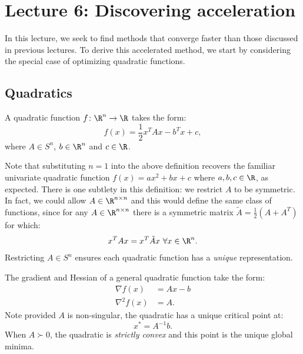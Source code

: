 \section{Lecture 6: Discovering acceleration}

In this lecture, we seek to find methods that converge faster than those discussed in previous lectures. To derive this accelerated method, we start by considering the special case of optimizing quadratic functions.

\subsection{Quadratics}

\begin{definition} A quadratic function $f\colon\R^n \to \R$ takes the form: 
\begin{equation*}
f(x) = \frac{1}{2}x^T A x - b^T x + c,
\end{equation*}
where $A \in S^n$, $b \in \R^n$ and $c \in \R$.
\end{definition}

Note that substituting $n=1$ into the above definition recovers the familiar univariate quadratic function $f(x) = ax^2 + bx + c$ where $a, b, c \in \R$, as expected. There is one subtlety in this definition: we restrict $A$ to be symmetric. In fact, we could allow $A \in \R^{n \times n}$ and this would define the same class of functions, since for any $A \in \R^{n \times n}$ there is a symmetric matrix $\tilde{A} = \frac{1}{2}\left(A + A^T\right)$ for which:
\begin{equation*}
x^TAx = x^T \tilde{A} x\ \forall x \in \R^n.
\end{equation*}
Restricting $A \in S^n$ ensures each quadratic function has a \textit{unique} representation.

The gradient and Hessian of a general quadratic function take the form:
\begin{align*}
\nabla f(x) &= Ax - b \\
\nabla^2 f(x) &= A.
\end{align*}
Note provided $A$ is non-singular, the quadratic has a unique critical point at:
\begin{equation*}
x^* = A^{-1}b.
\end{equation*}
When $A \succ 0$, the quadratic is \textit{strictly convex} and this point is the unique global minima.

